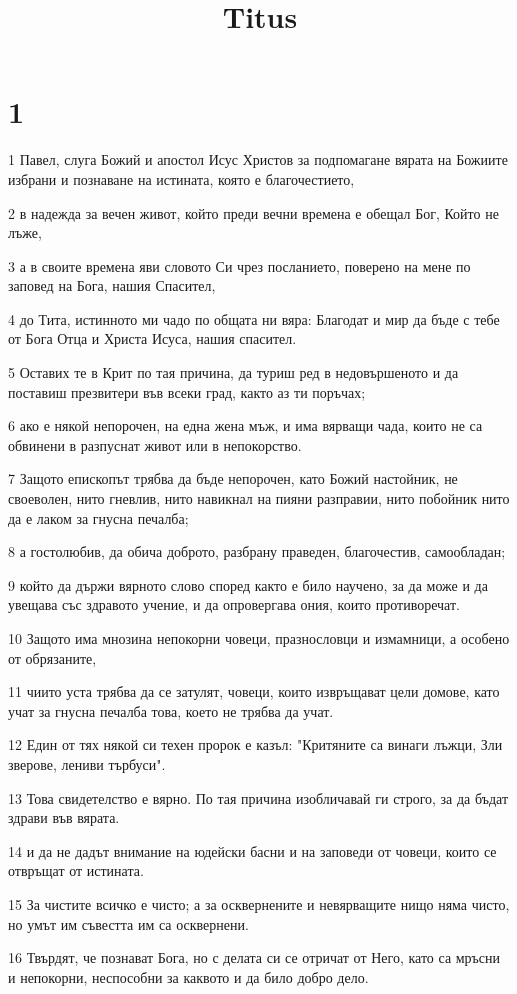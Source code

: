 

\title{Titus}


\chapter{1}

\par 1 Павел, слуга Божий и апостол Исус Христов за подпомагане вярата на Божиите избрани и познаване на истината, която е благочестието,
\par 2 в надежда за вечен живот, който преди вечни времена е обещал Бог, Който не лъже,
\par 3 а в своите времена яви словото Си чрез посланието, поверено на мене по заповед на Бога, нашия Спасител,
\par 4 до Тита, истинното ми чадо по общата ни вяра: Благодат и мир да бъде с тебе от Бога Отца и Христа Исуса, нашия спасител.
\par 5 Оставих те в Крит по тая причина, да туриш ред в недовършеното и да поставиш презвитери във всеки град, както аз ти поръчах;
\par 6 ако е някой непорочен, на една жена мъж, и има вярващи чада, които не са обвинени в разпуснат живот или в непокорство.
\par 7 Защото епископът трябва да бъде непорочен, като Божий настойник, не своеволен, нито гневлив, нито навикнал на пияни разправии, нито побойник нито да е лаком за гнусна печалба;
\par 8 а гостолюбив, да обича доброто, разбрану праведен, благочестив, самообладан;
\par 9 който да държи вярното слово според както е било научено, за да може и да увещава със здравото учение, и да опровергава ония, които противоречат.
\par 10 Защото има мнозина непокорни човеци, празнословци и измамници, а особено от обрязаните,
\par 11 чиито уста трябва да се затулят, човеци, които извръщават цели домове, като учат за гнусна печалба това, което не трябва да учат.
\par 12 Един от тях някой си техен пророк е казъл: "Критяните са винаги лъжци, Зли зверове, лениви търбуси".
\par 13 Това свидетелство е вярно. По тая причина изобличавай ги строго, за да бъдат здрави във вярата.
\par 14 и да не дадът внимание на юдейски басни и на заповеди от човеци, които се отвръщат от истината.
\par 15 За чистите всичко е чисто; а за осквернените и невярващите нищо няма чисто, но умът им съвестта им са осквернени.
\par 16 Твърдят, че познават Бога, но с делата си се отричат от Него, като са мръсни и непокорни, неспособни за каквото и да било добро дело.


